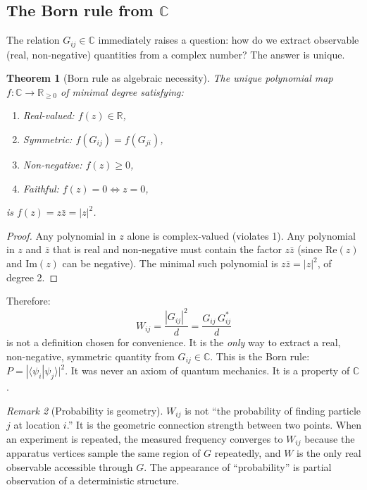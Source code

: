 \documentclass[12pt]{article}
\newtheorem{theorem}{Theorem}[section]
\theoremstyle{remark}
\newtheorem{remark}[theorem]{Remark}
\theoremstyle{definition}
\begin{document}
\subsection{The Born rule from $\mathbb{C}$}

The relation $G_{ij} \in \mathbb{C}$ immediately raises a question: how do we extract observable (real, non-negative) quantities from a complex number? The answer is unique.

\begin{theorem}[Born rule as algebraic necessity]
The unique polynomial map $f: \mathbb{C} \to \mathbb{R}_{\geq 0}$ of minimal degree satisfying:
\begin{enumerate}
\item Real-valued: $f(z) \in \mathbb{R}$,
\item Symmetric: $f(G_{ij}) = f(G_{ji})$,
\item Non-negative: $f(z) \geq 0$,
\item Faithful: $f(z) = 0 \Leftrightarrow z = 0$,
\end{enumerate}
is $f(z) = z\bar{z} = |z|^2$.
\end{theorem}

\begin{proof}
Any polynomial in $z$ alone is complex-valued (violates 1). Any polynomial in $z$ and $\bar{z}$ that is real and non-negative must contain the factor $z\bar{z}$ (since $\text{Re}(z)$ and $\text{Im}(z)$ can be negative). The minimal such polynomial is $z\bar{z} = |z|^2$, of degree 2.
\end{proof}

Therefore:
\begin{equation}
W_{ij} = \frac{|G_{ij}|^2}{d} = \frac{G_{ij}\,G^*_{ij}}{d}
\end{equation}
is not a definition chosen for convenience. It is the \emph{only} way to extract a real, non-negative, symmetric quantity from $G_{ij} \in \mathbb{C}$. This is the Born rule: $P = |\langle\psi_i|\psi_j\rangle|^2$. It was never an axiom of quantum mechanics. It is a property of $\mathbb{C}$.

\begin{remark}[Probability is geometry]
$W_{ij}$ is not ``the probability of finding particle $j$ at location $i$.'' It is the geometric connection strength between two points. When an experiment is repeated, the measured frequency converges to $W_{ij}$ because the apparatus vertices sample the same region of $G$ repeatedly, and $W$ is the only real observable accessible through $G$. The appearance of ``probability'' is partial observation of a deterministic structure.
\end{remark}
\end{document}
